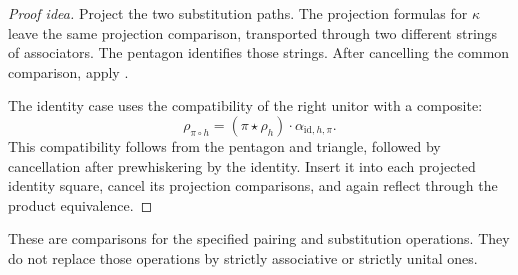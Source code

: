 \documentclass[11pt]{article}
\begin{document}
\begin{proof}[Proof idea]
Project the two substitution paths. The projection formulas for $\kappa$
leave the same projection comparison, transported through two different
strings of associators. The pentagon identifies those strings. After
cancelling the common comparison, apply
.

The identity case uses the compatibility of the right unitor with a
composite:
\[
 \rho_{\pi\circ h}
   =(\pi\star\rho_h)\cdot\alpha_{\mathrm{id},h,\pi}.
\]
This compatibility follows from the pentagon and triangle, followed by
cancellation after prewhiskering by the identity. Insert it into each
projected identity square, cancel its projection comparisons, and again
reflect through the product equivalence.
\end{proof}

These are comparisons for the specified pairing and substitution
operations. They do not replace those operations by strictly associative
or strictly unital ones.
\end{document}
